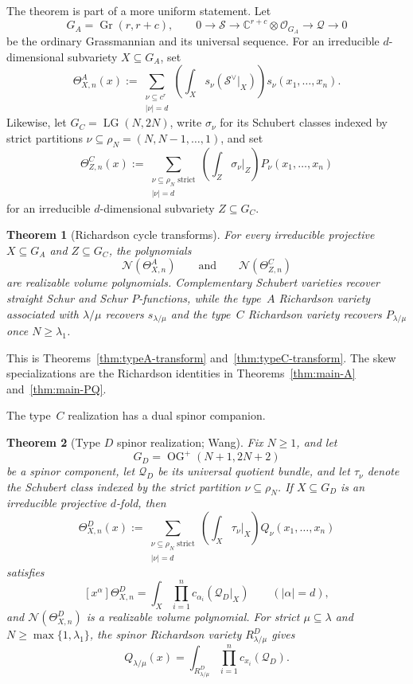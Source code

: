\documentclass[11pt,a4paper,oneside]{amsart}
\numberwithin{equation}{section}
\newtheorem{theorem}{Theorem}[section]
\theoremstyle{definition}
\theoremstyle{remark}
\DeclareMathOperator{\Gr}{Gr}
\DeclareMathOperator{\LG}{LG}
\newcommand{\C}{\mathbb C}
\newcommand{\cN}{\mathcal N}
\newcommand{\cO}{\mathcal O}
\newcommand{\cS}{\mathcal S}
\newcommand{\cQ}{\mathcal Q}
\begin{document}
The theorem is part of a more uniform statement.  Let
\[
 G_A=\Gr(r,r+c),
 \qquad
 0\longrightarrow\cS\longrightarrow\C^{r+c}\otimes\cO_{G_A}
 \longrightarrow\cQ\longrightarrow0
\]
be the ordinary Grassmannian and its universal sequence.  For an irreducible $d$-dimensional subvariety $X\subseteq G_A$, set
\[
 \Theta^A_{X,n}(x)
 :=\sum_{\substack{\nu\subseteq c^r\\|\nu|=d}}
 \left(\int_X s_\nu(\cS^\vee|_X)\right)s_\nu(x_1,\ldots,x_n).
\]
Likewise, let $G_C=\LG(N,2N)$, write $\sigma_\nu$ for its Schubert classes indexed by strict partitions $\nu\subseteq\rho_N=(N,N-1,\ldots,1)$, and set
\[
 \Theta^C_{Z,n}(x)
 :=\sum_{\substack{\nu\subseteq\rho_N\text{ strict}\\|\nu|=d}}
 \left(\int_Z\sigma_\nu|_Z\right)P_\nu(x_1,\ldots,x_n)
\]
for an irreducible $d$-dimensional subvariety $Z\subseteq G_C$.

\begin{theorem}[Richardson cycle transforms]\label{thm:intro-cycle-transforms}
For every irreducible projective $X\subseteq G_A$ and $Z\subseteq G_C$, the polynomials
\[
 \cN(\Theta^A_{X,n})
 \qquad\text{and}\qquad
 \cN(\Theta^C_{Z,n})
\]
are realizable volume polynomials.  Complementary Schubert varieties recover straight Schur and Schur $P$-functions, while the type~$A$ Richardson variety associated with $\lambda/\mu$ recovers $s_{\lambda/\mu}$ and the type~$C$ Richardson variety recovers $P_{\lambda/\mu}$ once $N\geq\lambda_1$.
\end{theorem}

This is Theorems~\ref{thm:typeA-transform} and~\ref{thm:typeC-transform}.  The skew specializations are the Richardson identities in Theorems~\ref{thm:main-A} and~\ref{thm:main-PQ}.

The type~$C$ realization has a dual spinor companion.

\begin{theorem}[Type $D$ spinor realization; Wang]\label{thm:intro-typeD}
Fix $N\geq1$, and let
\[
 G_D=\operatorname{OG}^{+}(N+1,2N+2)
\]
be a spinor component, let $\mathcal Q_D$ be its universal quotient bundle,
and let $\tau_\nu$ denote the Schubert class indexed by the strict partition
$\nu\subseteq\rho_N$.  If $X\subseteq G_D$ is an irreducible projective
$d$-fold, then
\[
 \Theta^D_{X,n}(x)
 :=\sum_{\substack{\nu\subseteq\rho_N\text{ strict}\\|\nu|=d}}
   \left(\int_X\tau_\nu|_X\right)Q_\nu(x_1,\ldots,x_n)
\]
satisfies
\[
 [x^\alpha]\Theta^D_{X,n}
 =\int_X\prod_{i=1}^n c_{\alpha_i}(\mathcal Q_D|_X)
 \qquad(|\alpha|=d),
\]
and $\cN(\Theta^D_{X,n})$ is a realizable volume polynomial.  For strict
$\mu\subseteq\lambda$ and $N\geq\max\{1,\lambda_1\}$, the spinor
Richardson variety $R^D_{\lambda/\mu}$ gives
\[
 Q_{\lambda/\mu}(x)
 =\int_{R^D_{\lambda/\mu}}
   \prod_{i=1}^n c_{x_i}(\mathcal Q_D).
\]
\end{theorem}
\end{document}
